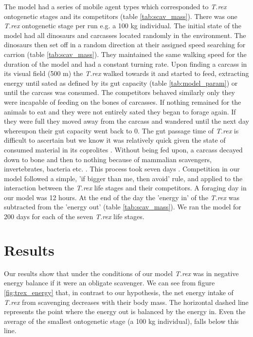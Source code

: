 The model had a series of mobile agent types which corresponded to \textit{T.rex} ontogenetic stages and its competitors (table \ref{tab:scav_mass}). There was one \textit{T.rex} ontogenetic stage per run e.g. a 100 kg individual. The initial state of the model had all dinosaurs and carcasses located randomly in the environment. The dinosaurs then set off in a random direction at their assigned speed searching for carrion (table \ref{tab:scav_mass}). They maintained the same walking speed for the duration of the model and had a constant turning rate. Upon finding a carcass in its visual field (500 m) the \textit{T.rex} walked towards it and started to feed, extracting energy until sated as defined by its gut capacity (table \ref{tab:model_param}) or until the carcass was consumed. The competitors behaved similarly only they were incapable of feeding on the bones of carcasses. If nothing remained for the animals to eat and they were not entirely sated they began to forage again. If they were full they moved away from the carcass and wandered until the next day whereupon their gut capacity went back to 0. The gut passage time of \textit{T.rex} is difficult to ascertain but we know it was relatively quick given the state of consumed material in its coprolites \citep{chin1998king,chin2003remarkable}. Without being fed upon, a carcass decayed down to bone and then to nothing because of mammalian scavengers, invertebrates, bacteria etc. \citep{sinclair1995serengeti}. This process took seven days \citep{carbone2011intra}. Competition in our model followed a simple, 'if bigger than me, then avoid' rule, and applied to the interaction between the \textit{T.rex} life stages and their competitors. A foraging day in our model was 12 hours. At the end of the day the 'energy in' of the \textit{T.rex} was subtracted from the 'energy out' (table \ref{tab:scav_mass}). We ran the model for 200 days for each of the seven \textit{T.rex} life stages.  


\section{\uppercase{R}esults}
Our results show that under the conditions of our model \textit{T.rex} was in negative energy balance if it were an obligate scavenger. We can see from figure \ref{fig:trex_energy} that, in contrast to our hypothesis, the net energy intake of \textit{T.rex} from scavenging decreases with their body mass. The horizontal dashed line represents the point where the energy out is balanced by the energy in. Even the average of the smallest ontogenetic stage (a 100 kg individual), falls below this line. 

